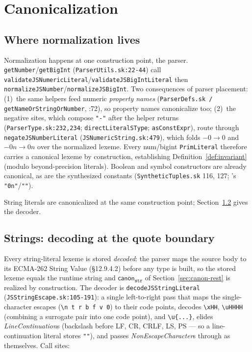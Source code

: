 \documentclass[11pt]{article}
\newcommand{\canon}{\mathsf{canon}}
\begin{document}
\section{Canonicalization}
\label{sec:fix}

\subsection{Where normalization lives}
\label{sec:where}

Normalization happens at one construction point, the parser.
\texttt{getNumber}/\texttt{getBigInt} (\texttt{ParserUtils.sk:22-44})
call \texttt{validateJSNumericLiteral}/\texttt{validateJSBigIntLiteral}
then \texttt{normalizeJSNumber}/\texttt{normalizeJSBigInt}. Two
consequences of parser placement: (1)~the same helpers feed numeric
\emph{property names} (\texttt{ParserDefs.sk / getNameOrStringOrNumber},
:72), so property names canonicalize too; (2)~the negative sites, which
compose \texttt{"-"} after the helper returns
(\texttt{ParserType.sk:232,234}; \texttt{directLiteralSType};
\texttt{asConstExpr}), route through \texttt{negateJSNumberLiteral}
(\texttt{JSNumericString.sk:479}), which folds $-0\to0$ and $-0n\to0n$
over the normalized lexeme. Every num/bigint \texttt{PrimLiteral}
therefore carries a canonical lexeme by construction, establishing
Definition~\ref{def:invariant} (modulo beyond-precision literals).
Boolean and symbol constructors are already canonical, as are the
synthesized constants (\texttt{SyntheticTuples.sk} 116, 127;
's \texttt{"0n"}/\texttt{""}).

String literals are canonicalized at the same construction point;
Section~\ref{sec:strings} gives the decoder.

\subsection{Strings: decoding at the quote boundary}
\label{sec:strings}

Every string-literal lexeme is stored \emph{decoded}: the parser maps
the source body to its ECMA-262 String Value (\S12.9.4.2) before any
type is built, so the stored lexeme equals the runtime string and
$\canon_{\texttt{str}}$ of Section~\ref{sec:canon-rest} is realized by
construction. The decoder is \texttt{decodeJSStringLiteral}
(\texttt{JSStringEscape.sk:105-191}): a single left-to-right pass that
maps the single-character escapes
(\texttt{\textbackslash n t r b f v 0}) to their code points, decodes
\texttt{\textbackslash xHH}, \texttt{\textbackslash uHHHH} (combining a
surrogate pair into one code point), and
\texttt{\textbackslash u\{...\}}, elides \emph{LineContinuation}s
(backslash before LF, CR, CRLF, LS, PS --- so a line-continuation
literal stores \texttt{""}), and passes \emph{NonEscapeCharacter}s
through as themselves. Call sites:
\end{document}
